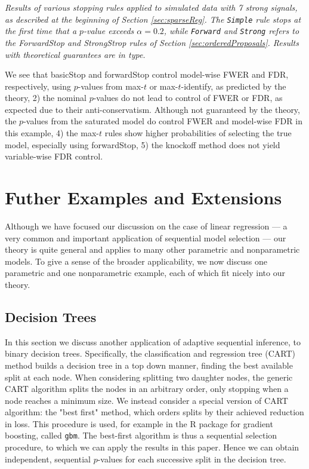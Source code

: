 \documentclass{article}
\begin{document}
\begin{table}[ht]
\centering

\caption[tab:stopping]{\em Results of various stopping rules applied to simulated data with 7 strong signals,  as described at the beginning of Section \ref{sec:sparseReg}.
The {\tt Simple} rule stops at the first time that a $p$-value exceeds $\alpha=0.2$, while {\tt Forward} and {\tt Strong} refers to the ForwardStop and StrongStrop rules of Section \ref{sec:orderedProposals}. Results with theoretical guarantees are in  type.}
\label{tab:stopping20}
\end{table}

We see that basicStop and forwardStop control model-wise FWER and FDR, respectively, using $p$-values from max-$t$ or max-$t$-identify, as predicted by the theory, 2) the nominal $p$-values do not lead to control of FWER or FDR, as expected due to their anti-conservatism. Although not guaranteed by the theory, the $p$-values from the saturated model do control FWER and model-wise FDR in this example, 4) the max-$t$ rules show higher probabilities of selecting the true model, especially using forwardStop, 5) the knockoff method does not yield variable-wise FDR control.


\section{Futher Examples and Extensions}\label{sec:further-examples}

Although we have focused our discussion on the case of linear regression --- a very common and important application of sequential model selection --- our theory is quite general and applies to many other parametric and nonparametric models. To give a sense of the broader applicability, we now discuss one parametric and one nonparametric example, each of which fit nicely into our theory.

\subsection{Decision Trees}
In this section we discuss another application of adaptive sequential inference, to binary decision trees. Specifically, the classification and regression tree  (CART)  method builds a decision tree in a top down manner, finding the best available split at each node.  When considering splitting two daughter nodes, the generic CART algorithm splits the nodes in an arbitrary order, only stopping when a node reaches a minimum size.  We instead consider a  special version of CART  algorithm:  the "best first"  method, which orders splits by their achieved reduction in loss. This procedure is used, for example in the R package for gradient boosting, called {\tt gbm}. The best-first algorithm is thus a sequential selection  procedure, to which we can apply the results in this paper. Hence we can obtain independent, sequential $p$-values for each successive split in the decision tree.
\end{document}

